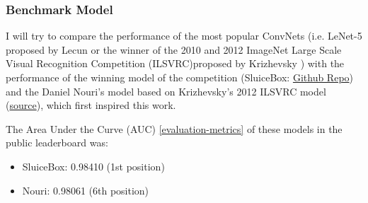 \documentclass[]{article}
\newcommand{\imagenet}{ImageNet Large Scale Visual Recognition Competition (ILSVRC)}
\begin{document}

\subsubsection{Benchmark Model}\label{benchmark-model}

I will try to compare the performance of the most popular ConvNets (i.e. LeNet-5 proposed by Lecun \cite{Lecun98} or the winner of the 2010 and 2012 \imagenet proposed by Krizhevsky \cite{Krizhevsky12}) with the performance of the winning model of the competition  (SluiceBox:  \href{https://github.com/nmkridler/moby}{Github Repo}) and the Daniel Nouri's model based on  Krizhevsky's 2012 ILSVRC model \cite{Krizhevsky12} (\href{https://speakerdeck.com/dnouri/practical-deep-neural-nets-for-detecting-marine-mammals/}{source}), which first inspired this work.

The Area Under the Curve (AUC) \ref{evaluation-metrics} of these models in the public leaderboard was:
\begin{itemize}
	\item SluiceBox: 0.98410 (1st position)
	\item Nouri: 0.98061 (6th position) %
\end{itemize}
\end{document}
